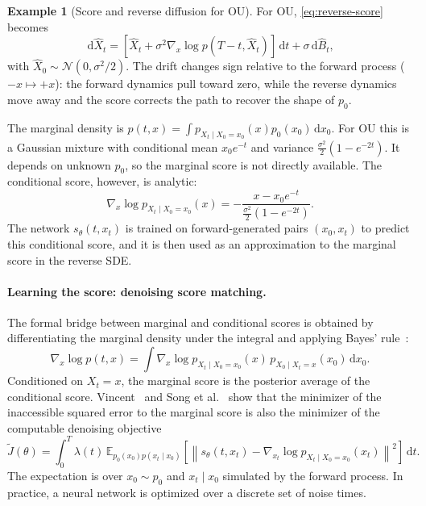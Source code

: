 \documentclass[12pt,a4paper]{report}
\theoremstyle{plain}
\theoremstyle{definition}
\newtheorem{example}{Example}[chapter]
\newcommand{\E}{\mathbb{E}}
\newcommand{\dd}{\,\mathrm{d}}
\newcommand{\norm}[1]{\left\|#1\right\|}
\begin{document}
\begin{example}[Score and reverse diffusion for OU]\label{ex:score-ou}
For OU, \eqref{eq:reverse-score} becomes
\[\dd\hat X_t=\left[\hat X_t+\sigma^2\nabla_x\log p(T-t,\hat X_t)\right]\dd t+\sigma\dd\hat B_t,\]
with $\hat X_0\sim\mathcal N(0,\sigma^2/2)$. The drift changes sign relative to the forward process ($-x\mapsto+x$): the forward dynamics pull toward zero, while the reverse dynamics move away and the score corrects the path to recover the shape of $p_0$.

The marginal density is $p(t,x)=\int p_{X_t\mid X_0=x_0}(x)p_0(x_0)\dd x_0$. For OU this is a Gaussian mixture with conditional mean $x_0e^{-t}$ and variance $\frac{\sigma^2}{2}(1-e^{-2t})$. It depends on unknown $p_0$, so the marginal score is not directly available. The conditional score, however, is analytic:
\[\nabla_x\log p_{X_t\mid X_0=x_0}(x)=-\frac{x-x_0e^{-t}}{\frac{\sigma^2}{2}(1-e^{-2t})}.\]
The network $s_\theta(t,x_t)$ is trained on forward-generated pairs $(x_0,x_t)$ to predict this conditional score, and it is then used as an approximation to the marginal score in the reverse SDE.
\end{example}

\paragraph{Learning the score: denoising score matching.}
The formal bridge between marginal and conditional scores is obtained by differentiating the marginal density under the integral and applying Bayes' rule~\cite{Hyvarinen2005}:
\[\nabla_x\log p(t,x)=\int\nabla_x\log p_{X_t\mid X_0=x_0}(x)\,p_{X_0\mid X_t=x}(x_0)\dd x_0.\]
Conditioned on $X_t=x$, the marginal score is the posterior average of the conditional score. Vincent~\cite{Vincent2011} and Song et al.~\cite{Song2021} show that the minimizer of the inaccessible squared error to the marginal score is also the minimizer of the computable denoising objective
\begin{equation}\tilde J(\theta)=\int_0^T\lambda(t)\,\E_{p_0(x_0)p(x_t\mid x_0)}\!\left[\norm{s_\theta(t,x_t)-\nabla_{x_t}\log p_{X_t\mid X_0=x_0}(x_t)}^2\right]\dd t.\label{eq:dsm}\end{equation}
The expectation is over $x_0\sim p_0$ and $x_t\mid x_0$ simulated by the forward process. In practice, a neural network is optimized over a discrete set of noise times.
\end{document}

